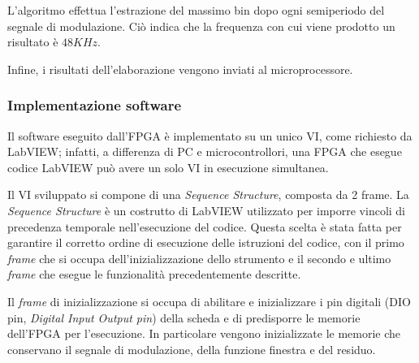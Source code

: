 L'algoritmo effettua l'estrazione del massimo bin dopo ogni semiperiodo del segnale di modulazione. Ciò indica che la frequenza con cui viene prodotto un risultato è $48KHz$.

Infine, i risultati dell'elaborazione vengono inviati al microprocessore.

\subsubsection{Implementazione software}
Il software eseguito dall'FPGA è implementato su un unico VI, come richiesto da LabVIEW; infatti, a differenza di PC e microcontrollori, una FPGA che esegue codice LabVIEW può avere un solo VI in esecuzione simultanea.

Il VI sviluppato si compone di una \textit{Sequence Structure}, composta da 2 frame. La \textit{Sequence Structure} è un costrutto di LabVIEW utilizzato per imporre vincoli di precedenza temporale nell'esecuzione del codice. Questa scelta è stata fatta per garantire il corretto ordine di esecuzione delle istruzioni del codice, con il primo \textit{frame} che si occupa dell'inizializzazione dello strumento e il secondo e ultimo \textit{frame} che esegue le funzionalità precedentemente descritte.

Il \textit{frame} di inizializzazione si occupa di abilitare e inizializzare i pin digitali (DIO pin, \textit{Digital Input Output pin}) della scheda e di predisporre le memorie dell'FPGA per l'esecuzione. In particolare vengono inizializzate le memorie che conservano il segnale di modulazione, della funzione finestra e del residuo.

